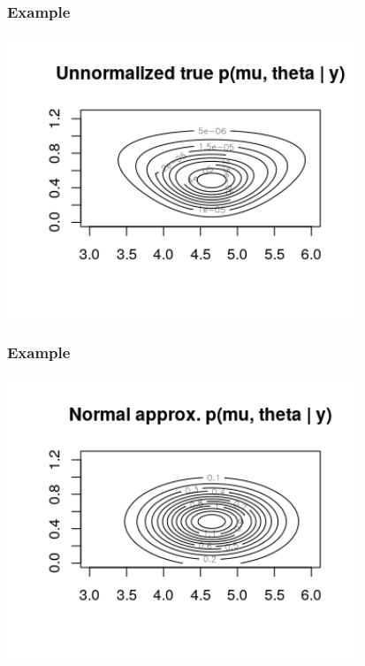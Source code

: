 \documentclass{beamer}
\begin{document}
\begin{frame}[fragile]
\frametitle{Example}

\begin{center}
\includegraphics[width=105mm]{unnorm_true}
\end{center}

\end{frame}

\begin{frame}[fragile]
\frametitle{Example}

\begin{center}
\includegraphics[width=105mm]{norm_approx}
\end{center}

\end{frame}
\end{document}
